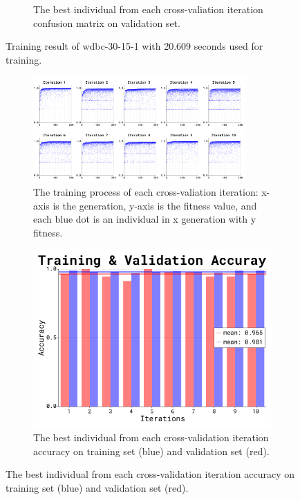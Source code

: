 \documentclass{article}
\begin{document}
\begin{figure}[ht]
\begin{subfigure}{\textwidth}
        \caption{The best individual from each cross-valiation iteration confusion matrix on validation set.}
        \label{fig:2c}
    \end{subfigure}
    \caption{Training result of wdbc-30-15-1 with 20.609 seconds used for training.}
    \label{fig:2}
\end{figure}
\FloatBarrier

\begin{figure}[ht]
    \begin{subfigure}{\textwidth}  
        \centering
        \includegraphics[width=0.89\textwidth]{wdbc-30-7-1/train_proc}
        \caption{The training process of each cross-valiation iteration: x-axis is the generation, y-axis is the fitness value, and each blue dot is an individual in x generation with y fitness.}
        \label{fig:3a}
    \end{subfigure}
    \begin{subfigure}{\textwidth}  
        \centering
        \includegraphics[scale=0.25]{wdbc-30-7-1/accuracy}
        \caption{The best individual from each cross-validation iteration accuracy on training set (blue) and validation set (red).}

\end{subfigure}
\end{figure}
\end{document}

